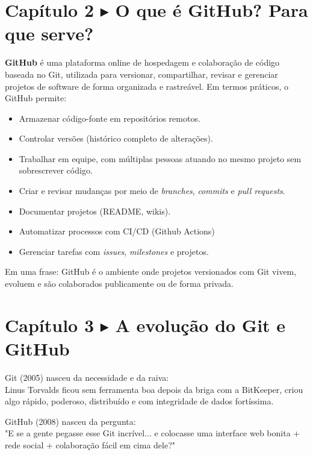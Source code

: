 \documentclass[a4paper]{article}
\begin{document}
    \newpage
    
    \section{Capítulo 2 $ \blacktriangleright $ O que é GitHub? Para que serve?}
    
    \bigskip
    
    \textbf{GitHub} é uma plataforma online de hospedagem e colaboração de código baseada no Git, utilizada para versionar, compartilhar, revisar e gerenciar projetos de software de forma organizada e rastreável.
    \smallskip
    Em termos práticos, o GitHub permite:
    
    \begin{itemize}
        \item Armazenar código-fonte em repositórios remotos.
        \item Controlar versões (histórico completo de alterações).
        \item Trabalhar em equipe, com múltiplas pessoas atuando no mesmo projeto sem sobrescrever código.
        \item Criar e revisar mudanças por meio de \textit{branches}, \textit{commits} e \textit{pull requests}.
        \item Documentar projetos (README, wikis).
        \item Automatizar processos com CI/CD (Github Actions)
        \item Gerenciar tarefas com \textit{issues}, \textit{milestones} e projetos.
    \end{itemize}	
    
    \medskip
    
    Em uma frase: GitHub é o ambiente onde projetos versionados com Git vivem, evoluem e são colaborados publicamente ou de forma privada.
    
    \newpage
    
    \section{Capítulo 3 $ \blacktriangleright $ A evolução do Git e GitHub}
    
    Git (2005) nasceu da necessidade e da raiva:\\
    Linus Torvalds ficou sem ferramenta boa depois da briga com a BitKeeper, criou algo rápido, poderoso, distribuído e com integridade de dados fortíssima.
    
    GitHub (2008) nasceu da pergunta:\\
    "E se a gente pegasse esse Git incrível... e colocasse uma interface web bonita + rede social + colaboração fácil em cima dele?"
    
\end{document}
